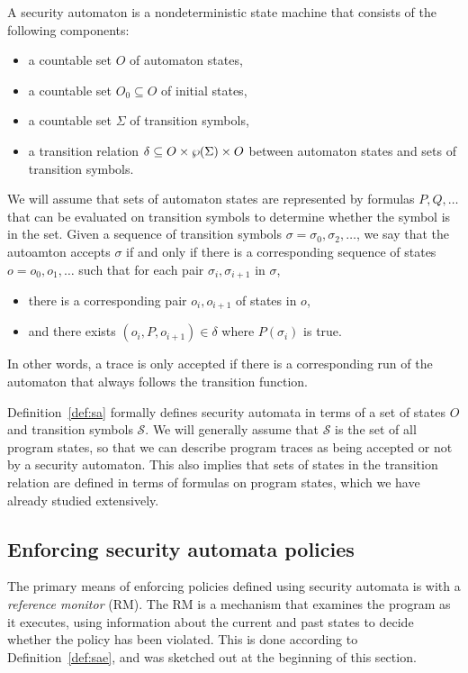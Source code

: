 \documentclass[11pt,twoside]{scrartcl}
\begin{document}
\begin{definition}
\label{def:sa}
A security automaton is a nondeterministic state machine that consists of the following components:
\begin{itemize}
\item a countable set $O$ of automaton states,
\item a countable set $O_0 \subseteq O$ of initial states,
\item a countable set $\Sigma$ of transition symbols,
\item a transition relation $\delta \subseteq O \times \wp(\Sigma) \times O$ between automaton states and sets of transition symbols.
\end{itemize}
We will assume that sets of automaton states are represented by formulas $P,Q,\ldots$ that can be evaluated on transition symbols to determine whether the symbol is in the set.
Given a sequence of transition symbols $\sigma = \sigma_0,\sigma_2,\ldots$, we say that the autoamton accepts $\sigma$ if and only if there is a corresponding sequence of states $o = o_0,o_1,\ldots$ such that for each pair $\sigma_{i},\sigma_{i+1}$ in $\sigma$,
\begin{itemize}
\item there is a corresponding pair $o_{i},o_{i+1}$ of states in $o$,
\item and there exists $(o_{i}, P, o_{i+1}) \in \delta$ where $P(\sigma_i)$ is true.
\end{itemize}
In other words, a trace is only accepted if there is a corresponding run of the automaton that always follows the transition function.
\end{definition}

Definition~\ref{def:sa} formally defines security automata in terms of a set of states $O$ and transition symbols $\mathcal{S}$. We will generally assume that $\mathcal{S}$ is the set of all program states, so that we can describe program traces as being accepted or not by a security automaton. This also implies that sets of states in the transition relation are defined in terms of formulas on program states, which we have already studied extensively.

\subsection{Enforcing security automata policies}

The primary means of enforcing policies defined using security automata is with a \emph{reference monitor} (RM). The RM is a mechanism that examines the program as it executes, using information about the current and past states to decide whether the policy has been violated. This is done according to Definition~\ref{def:sae}, and was sketched out at the beginning of this section.
\end{document}
